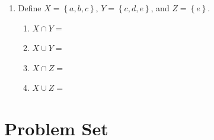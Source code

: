 \documentclass{tufte-book}
\begin{document}
\begin{enumerate}
  \item Define $X = \left\{a, b, c\right\}$, $Y = \left\{c, d, e\right\}$, and $Z = \left\{e\right\}$.
  \begin{enumerate}
    \item $X \cap Y = $\dotfill\bigskip
    \item $X \cup Y = $\dotfill\bigskip
    \item $X \cap Z = $\dotfill\bigskip
    \item $X \cup Z = $\dotfill\bigskip
  \end{enumerate}
\end{enumerate}

\clearpage\section{Problem Set }
\end{document}
